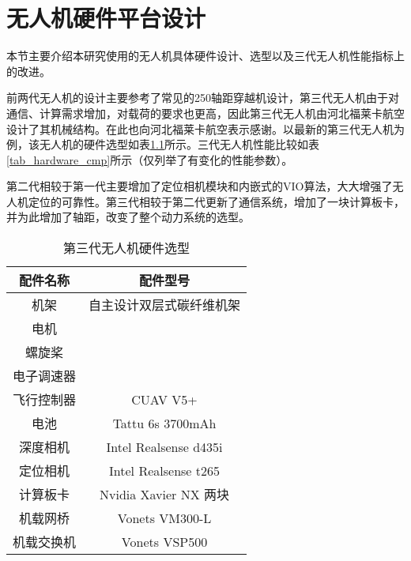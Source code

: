 
\chapter{无人机硬件平台设计}

本节主要介绍本研究使用的无人机具体硬件设计、选型以及三代无人机性能指标上的改进。

前两代无人机的设计主要参考了常见的250轴距穿越机设计\cite{zhou2020ego}，第三代无人机由于对通信、计算需求增加，对载荷的要求也更高，因此第三代无人机由河北福莱卡航空设计了其机械结构。在此也向河北福莱卡航空表示感谢。以最新的第三代无人机为例，该无人机的硬件选型如表\ref{tab_hardware}所示。三代无人机性能比较如表\ref{tab_hardware_cmp}所示（仅列举了有变化的性能参数）。

第二代相较于第一代主要增加了定位相机模块和内嵌式的VIO算法，大大增强了无人机定位的可靠性。第三代相较于第二代更新了通信系统，增加了一块计算板卡，并为此增加了轴距，改变了整个动力系统的选型。

\begin{table}
    \centering
    \begin{tabular}{cc}
    \hline
        配件名称 & 配件型号 \\ \hline
        机架 & 自主设计双层式碳纤维机架 \\ 
        电机 & ~ \\ 
        螺旋桨 & ~ \\ 
        电子调速器 & ~ \\ 
        飞行控制器 & CUAV V5+ \\ 
        电池 & Tattu 6s 3700mAh \\ 
        深度相机 & Intel Realsense d435i \\ 
        定位相机 & Intel Realsense t265 \\ 
        计算板卡 & Nvidia Xavier NX 两块 \\ 
        机载网桥 & Vonets VM300-L \\ 
        机载交换机 & Vonets VSP500 \\ \hline
    \end{tabular}
    \caption{第三代无人机硬件选型}
    \label{tab_hardware}
\end{table}

